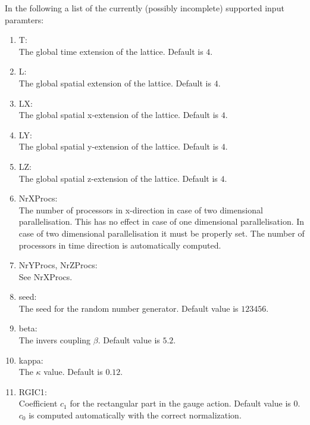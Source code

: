 In the following a list of the currently (possibly incomplete)
supported input paramters: 
\begin{enumerate}
\item {\ttfamily T}:\\
  The global time extension of the lattice. Default is $4$.

\item {\ttfamily L}:\\
  The global spatial extension of the lattice. Default is $4$.

\item {\ttfamily LX}:\\
  The global spatial x-extension of the lattice. Default is $4$.

\item {\ttfamily LY}:\\
  The global spatial y-extension of the lattice. Default is $4$.

\item {\ttfamily LZ}:\\
  The global spatial z-extension of the lattice. Default is $4$.

\item {\ttfamily NrXProcs}:\\
  The number of processors in x-direction in case of two dimensional
  parallelisation. This has no effect in case of one dimensional
  parallelisation. In case of two dimensional parallelisation it must
  be properly set. The number of processors in time direction is
  automatically computed.

\item {\ttfamily NrYProcs, NrZProcs}:\\
  See {\ttfamily NrXProcs}.

\item {\ttfamily seed}:\\
  The seed for the random number generator. Default value is $123456$.

\item {\ttfamily beta}:\\
  The invers coupling $\beta$. Default value is $5.2$.

\item {\ttfamily kappa}:\\
  The $\kappa$ value. Default is $0.12$.

\item {\ttfamily RGIC1}:\\
  Coefficient $c_1$ for the rectangular part in the gauge
  action. Default value is $0$. $c_0$ is computed automatically with
  the correct normalization.


\end{enumerate}
